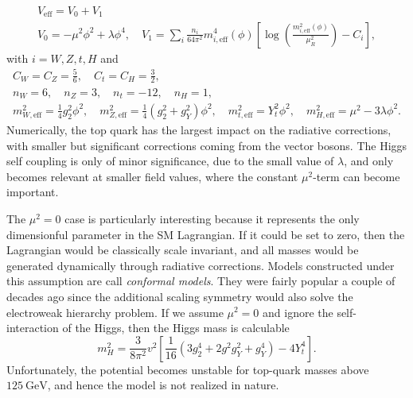 \begin{equation}
\begin{gathered}
V_\text{eff} = V_0 + V_1\\
V_0 = - \mu^2 \phi^2 + \lambda \phi^4, \quad V_1 = \sum_{i} \frac{n_i}{64 \pi^2} m_{i, \text{eff}}^4(\phi) \left[ \log\! \left( \frac{m_{i, \text{eff}}^2 (\phi)}{\mu_R^2} \right) - C_i \right],
\end{gathered}
\end{equation}
with $i = W,Z, t, H$ and
\begin{equation}
\begin{gathered}
C_W = C_Z = \frac{5}{6}, \quad C_t = C_H = \frac{3}{2}, \\
n_W = 6, \quad n_Z = 3, \quad n_t = -12, \quad n_H = 1, \\
m_{W, \text{eff}}^2 = \frac{1}{4} g_2^2 \phi^2, \quad m_{Z, \text{eff}}^2 = \frac{1}{4} \left(g_2^2 + g_Y^2 \right) \phi^2, \quad m_{t, \text{eff}}^2 = Y_t^2 \phi^2, \quad m_{H, \text{eff}}^2 = \mu^2 - 3 \lambda \phi^2.
\end{gathered}
\label{eq:3:Veff_params}
\end{equation}
Numerically, the top quark has the largest impact on the radiative corrections, with smaller but significant corrections coming from the vector bosons. The Higgs self coupling is only of minor significance, due to the small value of $\lambda$, and only becomes relevant at smaller field values, where the constant $\mu^2$-term can become important.

The $\mu^2 = 0$ case is particularly interesting because it represents the only dimensionful parameter in the \acs{SM} Lagrangian. If it could be set to zero, then the Lagrangian would be classically scale invariant, and all masses would be generated dynamically through radiative corrections. Models constructed under this assumption are call \textit{conformal models}. They were fairly popular a couple of decades ago since the additional scaling symmetry would also solve the electroweak hierarchy problem. If we assume $\mu^2 = 0$ and ignore the self-interaction of the Higgs, then the Higgs mass is calculable
\begin{equation}
m_H^2 = \frac{3}{8 \pi^2}v^2 \left[ \frac{1}{16} (3 g_2^4 + 2 g^2 g_Y^2 + g_Y^4) - 4 Y_t^4 \right] .
\end{equation}
Unfortunately, the potential becomes unstable for top-quark masses above $125\ \mathrm{GeV}$, and hence the model is not realized in nature.

